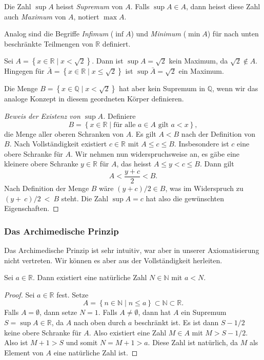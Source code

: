 \documentclass[../main.tex]{subfiles}
\begin{document}
Die Zahl $\sup A$ heisst \emph{Supremum} von $A$. Falls
$\sup A \in A$, dann heisst diese Zahl auch \emph{Maximum} von $A$,
notiert $\max A$.

Analog sind die Begriffe \emph{Infimum} ($\inf A$) und
\emph{Minimum} ($\min A$) für nach unten beschränkte
Teilmengen von $\mathbb{R}$ definiert.
 
\begin{example}
  Sei $A = \left\{x \in \mathbb{R} \mid x < \sqrt 2\right\}$.
  Dann ist $\sup A = \sqrt 2$ kein Maximum, da $\sqrt 2 \notin A$.
  Hingegen für 
  $\bar A = \left\{x \in \mathbb{R} \mid x \leq \sqrt 2\right\}$
  ist $\sup \bar A = \sqrt 2$ ein Maximum.

  Die Menge $B = \left\{x \in \mathbb{Q} \mid x < \sqrt 2\right\}$
  hat aber kein Supremum in $\mathbb{Q}$, wenn wir das analoge
  Konzept in diesem 
  geordneten Körper definieren. 
\end{example}

\begin{proof}[Beweis der Existenz von $\sup A$]
  Definiere
  \[
	  B = \left\{x \in \mathbb{R} \mid \text{für alle } a \in A
  \text{ gilt } a < x\right\},
  \]
  die Menge aller oberen Schranken von $A$. Es gilt $A < B$
  nach der Definition von $B$.
  Nach Vollständigkeit existiert $c \in \mathbb{R}$
  mit $A \leq c \leq B$.
  Insbesondere ist $c$ eine obere Schranke für $A$.
  Wir nehmen nun widerspruchsweise an, es gäbe eine
  kleinere obere Schranke $y \in \mathbb{R}$ für $A$,
  das heisst $A \leq y < c \leq B$.
  Dann gilt
  \[
    A < \frac{y + c}{2} < B.
  \]
  Nach Definition der Menge $B$ wäre
  $(y + c)/2 \in B$, was im Widerspruch zu $(y +~c)/2~<~B$ steht.
  Die Zahl $\sup A = c$ hat also die gewünschten Eigenschaften.
\end{proof}

\subsubsection*{Das Archimedische Prinzip}
Das Archimedische Prinzip ist sehr intuitiv, war aber in
unserer Axiomatisierung nicht vertreten. Wir können
es aber aus der Vollständigkeit herleiten.

\begin{archimedes}
  Sei $a \in \mathbb{R}$. Dann existiert eine natürliche
  Zahl $N \in \mathbb{N}$ mit $a < N$.
\end{archimedes}

\begin{proof}
  Sei $a \in \mathbb{R}$ fest. Setze
  \[
    A = \left\{n \in \mathbb{N} \mid n \leq a\right\} \subset \mathbb{N}
    \subset \mathbb{R}.
  \]
  Falls $A = \emptyset$, dann setze $N = 1$.
  Falls $A \neq \emptyset$, dann hat $A$ ein Supremum
  $S = \sup A \in \mathbb{R}$, da $A$ nach oben 
  durch $a$ beschränkt ist.
  Es ist dann $S - 1/2$ keine obere Schranke für $A$. 
  Also existiert eine Zahl $M \in A$ mit $M > S - 1/2$.
  Also ist $M + 1 > S$ und somit $N = M + 1 > a$. Diese Zahl ist
  natürlich, da $M$ als Element von $A$ eine natürliche Zahl ist.
\end{proof}
\end{document}
